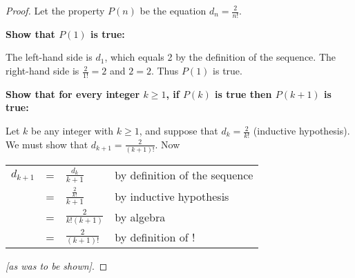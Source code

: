 \documentclass[14pt]{extarticle}
\newcommand{\dps}{\displaystyle}
\newcommand{\cy}{\color{cyan}}
\begin{document}
\begin{proof}
    Let the property $P(n)$ be the equation $\dps d_n = \frac{2}{n!}$.

        {\bf Show that $P(1)$ is true:}

    The left-hand side is $d_1$, which equals 2 by the definition of the sequence. The right-hand side is $\dps \frac{2}{1!} = 2$ and $2 = 2$. Thus $P(1)$ is true.

        {\bf Show that for every integer $k \geq 1$, if $P(k)$ is true then $P(k + 1)$ is true:}

    Let $k$ be any integer with $k \geq 1$, and suppose that $\dps d_k = \frac{2}{k!}$ ({\cy inductive hypothesis}). We must show that $\dps d_{k + 1} = \frac{2}{(k + 1)!}$. Now

    \begin{center}
        \begin{tabular}{rlll}
            \vspace{0.3cm}
            $d_{k+1}$ & = & $\dps \frac{d_k}{k+1}$          & {\cy by definition of the sequence} \\
            \vspace{0.3cm}
                      & = & $\dps \frac{\frac{2}{k!}}{k+1}$ & {\cy by inductive hypothesis}       \\
                      & = & $\dps \frac{2}{k!(k+1)}$        & {\cy by algebra}                    \\
                      & = & $\dps \frac{2}{(k + 1)!}$       & {\cy by definition of !}
        \end{tabular}
    \end{center}

    {\it [as was to be shown]}.
\end{proof}
\end{document}
